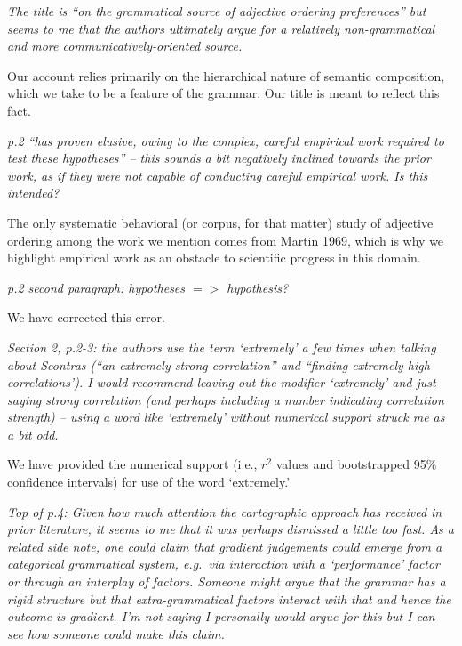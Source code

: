 \documentclass[12pt]{article}
\begin{document}
\item \emph{The title is ``on the grammatical source of adjective ordering
preferences'' but seems to me that the authors ultimately argue for a
relatively non-grammatical and more communicatively-oriented source.}

Our account relies primarily on the hierarchical nature of semantic composition, which we take to be a feature of the grammar. Our title is meant to reflect this fact.

\item \emph{p.2 ``has proven elusive, owing to the complex, careful empirical work
required to test these hypotheses'' – this sounds a bit negatively
inclined towards the prior work, as if they were not capable of conducting
careful empirical work. Is this intended?}

The only systematic behavioral (or corpus, for that matter) study of adjective ordering among the work we mention comes from Martin 1969, which is why we highlight empirical work as an obstacle to scientific progress in this domain.

\item \emph{p.2 second paragraph: hypotheses $=>$ hypothesis?}

We have corrected this error.

\item \emph{Section 2, p.2-3: the authors use the term `extremely' a few times when talking about Scontras (``an extremely strong correlation'' and ``finding
extremely high correlations').  I would recommend leaving out the modifier
`extremely' and just saying strong correlation (and perhaps including a
number indicating correlation strength) – using a word like
`extremely' without numerical support struck me as a bit odd.}

We have provided the numerical support (i.e., $r^2$ values and bootstrapped 95\% confidence intervals) for use of the word `extremely.'

\item \emph{Top of p.4: Given how much attention the cartographic approach has received in prior literature, it seems to me that it was perhaps dismissed a little too fast. As a related side note, one could claim that gradient judgements
could emerge from a categorical grammatical system, e.g.~via interaction with
a `performance' factor or through an interplay of factors. Someone might
argue that the grammar has a rigid structure but that extra-grammatical
factors interact with that and hence the outcome is gradient. I'm not
saying I personally would argue for this but I can see how someone could
make this claim.}
\end{document}
